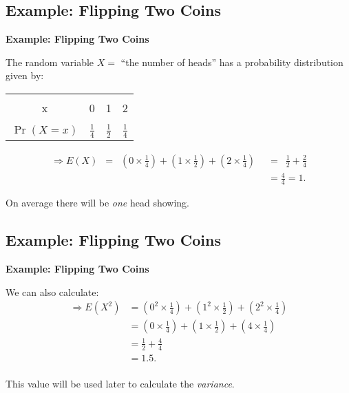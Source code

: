 \documentclass[compress]{beamer}        %
\makeatletter
\newcommand{\tcb}{\textcolor{beamer@blendedblue}}
\makeatother
\begin{document}
\subsection{Example: Flipping Two Coins}
\begin{frame}{\bf \tcb{Example: Flipping Two Coins}}

The random variable $X =$ ``the number of heads'' has a probability distribution given by:
\begin{center}
\begin{tabular}{|c|ccc|}
\hline
&&&\\[-0.4cm]
x & 0 & 1 & 2 \\
\hline
&&&\\[-0.4cm]
$\Pr(X=x)$ & $\frac{1}{4}$ & $\frac{1}{2}$ & $\frac{1}{4}$\\[0.1cm]
\hline
\end{tabular}
\end{center}

\begin{align*}
\Rightarrow E(X) \,\,\,= \,\,\,\left(0\times\frac{1}{4}\right) + \left(1\times\frac{1}{2}\right) + \left(2\times\frac{1}{4}\right) \,\,\,&=\,\,\, \frac{1}{2} + \frac{2}{4} \\[0.2cm]
&= \frac{4}{4} = 1.
\end{align*}

On average there will be \emph{one} head showing.

\end{frame}



\subsection{Example: Flipping Two Coins}
\begin{frame}{\bf \tcb{Example: Flipping Two Coins}}

We can also calculate:
\begin{align*}
\Rightarrow E(X^2) &= \left(0^2\times\frac{1}{4}\right) + \left(1^2\times\frac{1}{2}\right) + \left(2^2\times\frac{1}{4}\right) \\[0.2cm]
&= \left(0\times\frac{1}{4}\right) + \left(1\times\frac{1}{2}\right) + \left(4\times\frac{1}{4}\right) \\[0.2cm]
&= \frac{1}{2} + \frac{4}{4} \\[0.2cm]
&= 1.5.\\
\end{align*}

This value will be used later to calculate the \emph{variance}.

\end{frame}
\end{document}
